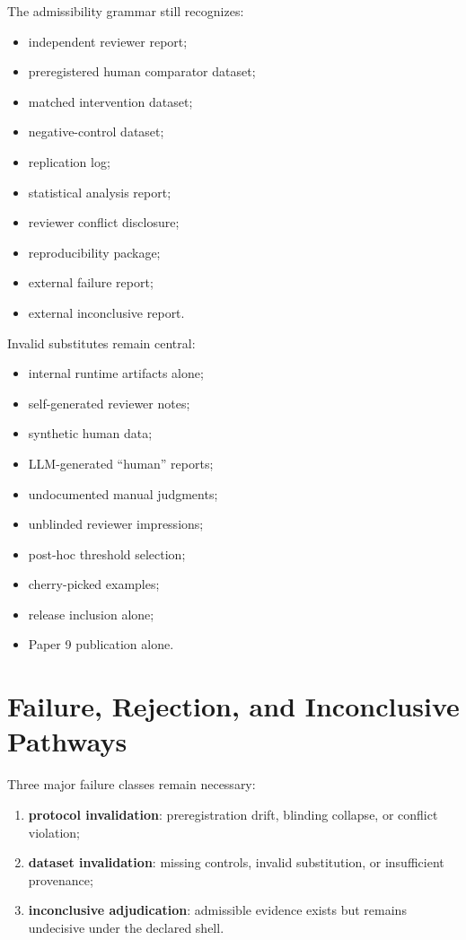 \documentclass[11pt,a4paper]{article}
\begin{document}
The admissibility grammar still recognizes:

\begin{itemize}
\item independent reviewer report;
\item preregistered human comparator dataset;
\item matched intervention dataset;
\item negative-control dataset;
\item replication log;
\item statistical analysis report;
\item reviewer conflict disclosure;
\item reproducibility package;
\item external failure report;
\item external inconclusive report.
\end{itemize}

Invalid substitutes remain central:

\begin{itemize}
\item internal runtime artifacts alone;
\item self-generated reviewer notes;
\item synthetic human data;
\item LLM-generated ``human'' reports;
\item undocumented manual judgments;
\item unblinded reviewer impressions;
\item post-hoc threshold selection;
\item cherry-picked examples;
\item release inclusion alone;
\item Paper 9 publication alone.
\end{itemize}

\section{Failure, Rejection, and Inconclusive Pathways}

Three major failure classes remain necessary:

\begin{enumerate}
\item \textbf{protocol invalidation}: preregistration drift, blinding collapse, or conflict violation;
\item \textbf{dataset invalidation}: missing controls, invalid substitution, or insufficient provenance;
\item \textbf{inconclusive adjudication}: admissible evidence exists but remains undecisive under the declared shell.
\end{enumerate}
\end{document}
